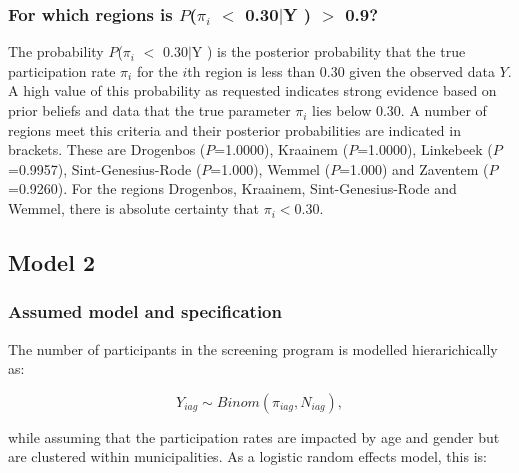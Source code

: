 \documentclass[12pt]{article}
\begin{document}
    



\subsubsection{For which regions is $P$($\pi_i$ $<$ 0.30$|$Y ) $>$ 0.9?}

The probability $P$($\pi_i$ $<$ 0.30$|$Y ) is the posterior probability that the true participation rate $\pi_i$ for the $i$th region is less than 0.30 given the observed data $Y$. A high value of this probability as requested indicates strong evidence based on prior beliefs and data that the true parameter $\pi_i$ lies below 0.30. A number of regions meet this criteria and their posterior probabilities are indicated in brackets. These are Drogenbos ($P$=1.0000), Kraainem ($P$=1.0000), Linkebeek ($P$=0.9957), Sint-Genesius-Rode ($P$=1.000), Wemmel ($P$=1.000) and Zaventem ($P$=0.9260). For the regions Drogenbos, Kraainem, Sint-Genesius-Rode and Wemmel, there is absolute certainty that $\pi_i <$0.30.

\newpage

\subsection{Model 2}

\subsubsection{Assumed model and specification}

The number of participants in the screening program is modelled hierarichically as:

\[
    Y_{iag} \sim Binom(\pi_{iag}, N_{iag}),
\]

while assuming that the participation rates are impacted by age and gender but are clustered within municipalities. As a logistic random effects model, this is: 
\end{document}
